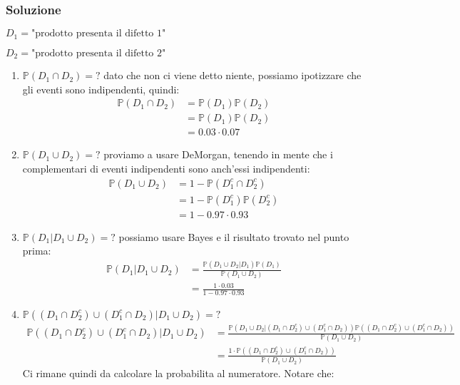 \subsubsection{Soluzione}

$ D_1 = \text{"prodotto presenta il difetto 1"} $

$ D_2 = \text{"prodotto presenta il difetto 2"} $
\begin{enumerate}[label=(\alph*)]
  \item $ \mathbb{P}(D_1 \cap D_2) = ? $ dato che non ci viene detto niente, possiamo ipotizzare che gli eventi sono indipendenti, quindi:
    \begin{align*}
      \mathbb{P}(D_1 \cap D_2) &= \mathbb{P}(D_1)\mathbb{P}(D_2)\\
      &= \mathbb{P}(D_1)\mathbb{P}(D_2)\\
      &= 0.03 \cdot 0.07
    \end{align*}
  \item $ \mathbb{P}(D_1 \cup D_2) = ? $ proviamo a usare DeMorgan, tenendo in mente che i complementari di eventi indipendenti sono anch'essi indipendenti:
    \begin{align*}
      \mathbb{P}(D_1 \cup D_2) &= 1 - \mathbb{P}(D_1^{c} \cap D_2^{c})\\
      &= 1 - \mathbb{P}(D_1^{c})\mathbb{P}(D_2^{c})\\
      &= 1 - 0.97\cdot 0.93
    \end{align*}
  \item $ \mathbb{P}(D_1 | D_1 \cup D_2) = ? $ possiamo usare Bayes e il risultato trovato nel punto prima:
    \begin{align*}
      \mathbb{P}(D_1 | D_1 \cup D_2) &= \frac{\mathbb{P}(D_1 \cup D_2 | D_1)\mathbb{P}(D_1)}{\mathbb{P}(D_1 \cup D_2)}\\
      &= \frac{1\cdot 0.03}{1 - 0.97\cdot 0.93}
    \end{align*}
  \item $ \mathbb{P}((D_1 \cap D_2^{c})\cup(D_1^{c} \cap D_2) | D_1 \cup D_2) = ? $
    \begin{align*}
      \mathbb{P}((D_1 \cap D_2^{c}) \cup (D_1^{c} \cap D_2) | D_1 \cup D_2) &= \frac{\mathbb{P}(D_1 \cup D_2 | (D_1 \cap D_2^{c})\cup (D_1^{c} \cap D_2))\mathbb{P}((D_1 \cap D_2^{c})\cup(D_1^{c} \cap D_2))}{\mathbb{P}(D_1 \cup D_2)}\\
      &= \frac{1 \cdot \mathbb{P}((D_1 \cap D_2^{c})\cup(D_1^{c} \cap D_2))}{\mathbb{P}(D_1 \cup D_2)}
    \end{align*}
    Ci rimane quindi da calcolare la probabilita al numeratore. Notare che:

\end{enumerate}

